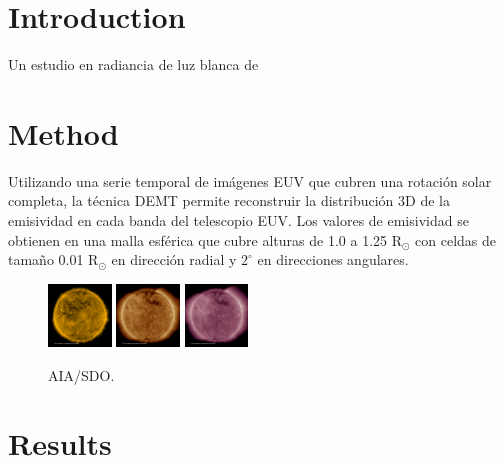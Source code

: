 \documentclass[baaa]{baaa}
\begin{document}

\maketitle

\section{Introduction}
\label{intro}


Un estudio en radiancia de luz blanca de \cite{awsom}

\section{Method}

Utilizando una serie temporal de imágenes EUV que cubren una rotación solar completa, la técnica DEMT permite reconstruir la distribución 3D de la emisividad en cada banda del telescopio EUV. Los valores de emisividad se obtienen en una malla esférica que cubre alturas de 1.0 a 1.25 R$_\odot$ con celdas de tamaño 0.01 R$_\odot$ en dirección radial y $2^\circ$ en direcciones angulares.

\begin{figure}
  \centering
  \includegraphics[width=0.15\textwidth]{figures/img_171.pdf}
  \includegraphics[width=0.15\textwidth]{figures/img_193.pdf}
  \includegraphics[width=0.15\textwidth]{figures/img_211.pdf}
  \caption{AIA/SDO.}
  \label{fig_00}
\end{figure}


\section{Results}
\end{document}

